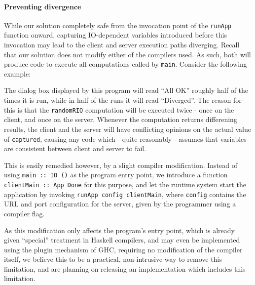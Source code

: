 \documentclass[preprint]{sigplanconf}
\begin{document}
\paragraph{Preventing divergence} While our solution completely safe from the
invocation point of the \lstinline!runApp! function onward, capturing
IO-dependent variables introduced before this invocation may lead to the client
and server execution paths diverging. Recall that our solution does not modify
either of the compilers used. As such, both will produce code to execute all
computations called by \lstinline!main!. Consider the following example:


The dialog box displayed by this program will read ``All OK'' roughly half
of the times it is run, while in half of the runs it will read ``Diverged''.
The reason for this is that the \lstinline!randomRIO! computation will be
executed twice - once on the client, and once on the server. Whenever the
computation returns differening results, the client and the server will have
conflicting opinions on the actual value of \lstinline!captured!, causing any
code which - quite reasonably - assumes that variables are consistent between
client and server to fail.

This is easily remedied however, by a slight compiler modification. Instead of
using \lstinline!main :: IO ()! as the program entry point, we introduce a
function \lstinline!clientMain :: App Done! for this purpose, and let the runtime
system start the application by invoking \lstinline!runApp config clientMain!,
where \lstinline!config! contains the URL and port configuration for the
server, given by the programmer using a compiler flag.

As this modification only affects the program's entry point, which is already
given ``special'' treatment in Haskell compilers, and may even be implemented
using the plugin mechanism of GHC, requiring no modification of the compiler
itself, we believe this to be a practical, non-intrusive way to remove this
limitation, and are planning on releasing an implementation which includes
this limitation.
\end{document}
